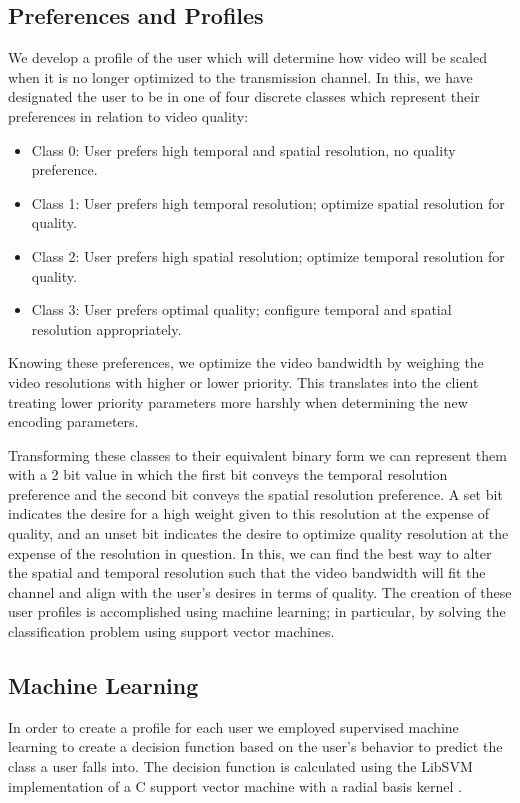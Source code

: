 \documentclass[a4paper,12pt]{article}
\begin{document}
\subsection{Preferences and Profiles}

We develop a profile of the user which will determine how video will be scaled when it is no longer optimized to the transmission channel. In this, we have designated the user to be in one of four discrete classes which represent their preferences in relation to video quality:
\begin{itemize}
\item Class 0: User prefers high temporal and spatial resolution, no quality preference.
\item Class 1: User prefers high temporal resolution; optimize spatial resolution for quality.
\item Class 2: User prefers high spatial resolution; optimize temporal resolution for quality.
\item Class 3: User prefers optimal quality; configure temporal and spatial resolution appropriately.
\end{itemize}
Knowing these preferences, we optimize the video bandwidth by weighing the video resolutions with higher or lower priority. This translates into the client treating lower priority parameters more harshly when determining the new encoding parameters.

Transforming these classes to their equivalent binary form we can represent them with a 2 bit value in which the first bit conveys the temporal resolution preference and the second bit conveys the spatial resolution preference. A set bit indicates the desire for a high weight given to this resolution at the expense of quality, and an unset bit indicates the desire to optimize quality resolution at the expense of the resolution in question. In this, we can find the best way to alter the spatial and temporal resolution such that the video bandwidth will fit the channel and align with the user's desires in terms of quality. The creation of these user profiles is accomplished using machine learning; in particular, by solving the classification problem using support vector machines.

\subsection{Machine Learning}
In order to create a profile for each user we employed supervised machine learning to create a decision function based on the user’s behavior to predict the class a user falls into. The decision function is calculated using the LibSVM implementation of a C support vector machine with a radial basis kernel \cite{LibSVM}.
\end{document}
